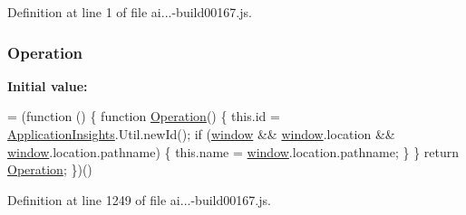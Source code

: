 Definition at line 1 of file ai...-\/build00167.\+js.

\subsubsection[{\texorpdfstring{Operation}{Operation}}]{ Operation}\hypertarget{obj_2_release_2_package_2_package_tmp_2_scripts_2ai_80_822_89-build00167_8js_a53ec7a54b2849bab2d97eca342a7bb17}{}\label{obj_2_release_2_package_2_package_tmp_2_scripts_2ai_80_822_89-build00167_8js_a53ec7a54b2849bab2d97eca342a7bb17}
{\bfseries Initial value\+:}
\begin{DoxyCode}
= (\textcolor{keyword}{function} () \{
                \textcolor{keyword}{function} \hyperlink{obj_2_release_2_package_2_package_tmp_2_scripts_2ai_80_822_89-build00167_8js_a53ec7a54b2849bab2d97eca342a7bb17}{Operation}() \{
                    this.\textcolor{keywordtype}{id} = \hyperlink{obj_2_release_2_package_2_package_tmp_2_scripts_2ai_80_822_89-build00167_8js_aa415ef4f8cdd699689ef4b61db7656d8}{ApplicationInsights}.Util.newId();
                    \textcolor{keywordflow}{if} (\hyperlink{obj_2_release_2_package_2_package_tmp_2_scripts_2jquery-1_810_82_8js_a04a8a2bbfa9c15500892b8e5033d625b}{window} && \hyperlink{obj_2_release_2_package_2_package_tmp_2_scripts_2jquery-1_810_82_8js_a04a8a2bbfa9c15500892b8e5033d625b}{window}.location && \hyperlink{obj_2_release_2_package_2_package_tmp_2_scripts_2jquery-1_810_82_8js_a04a8a2bbfa9c15500892b8e5033d625b}{window}.location.pathname) \{
                        this.name = \hyperlink{obj_2_release_2_package_2_package_tmp_2_scripts_2jquery-1_810_82_8js_a04a8a2bbfa9c15500892b8e5033d625b}{window}.location.pathname;
                    \}
                \}
                \textcolor{keywordflow}{return} \hyperlink{obj_2_release_2_package_2_package_tmp_2_scripts_2ai_80_822_89-build00167_8js_a53ec7a54b2849bab2d97eca342a7bb17}{Operation};
            \})()
\end{DoxyCode}


Definition at line 1249 of file ai...-\/build00167.\+js.

